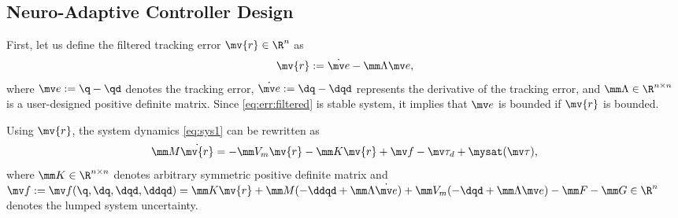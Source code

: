 \documentclass[lettersize,journal]{IEEEtran}
\newcommand*{\fe}{\mv{r}}
\begin{document}
\subsection{Neuro-Adaptive Controller Design}\label{sec:sub:NAC}

First, let us define the filtered tracking error $\fe\in\R^n$ as 
\begin{equation}
    \fe := \dot{\mv e}-\mm\Lambda \mv e
    ,
    \label{eq:err:filtered}
\end{equation}
where $\mv e := \q - \qd$ denotes the tracking error, $\dot{\mv e} := \dq - \dqd$ represents the derivative of the tracking error, and $\mm\Lambda\in\R^{n\times n}$ is a user-designed positive definite matrix.
Since \eqref{eq:err:filtered} is stable system, it implies that $\mv e$ is bounded if $\fe$ is bounded.

Using $\fe$, the system dynamics \eqref{eq:sys1} can be rewritten as
\begin{equation}
    \mm M \dot\fe
    =
    -\mm V_m \fe
    -\mm K \fe
    + \mv f
    -\mv \tau_d + \mysat(\mv\tau)
    ,
    \label{eq:sys:filtered}
\end{equation}
where $\mm K\in\R^{n\times n}$ denotes arbitrary symmetric positive definite matrix and $
    \mv f:= \mv f(\q,\dq,\dqd,\ddqd)
    =
    \mm K \fe
    +\mm M(-\ddqd+\mm\Lambda\dot{\mv e})
    +
    \mm V_m(-\dqd+\mm\Lambda\mv e)
    -
    \mm F
    -
    \mm G
    \in\R^n
$ denotes the lumped system uncertainty.
\end{document}
